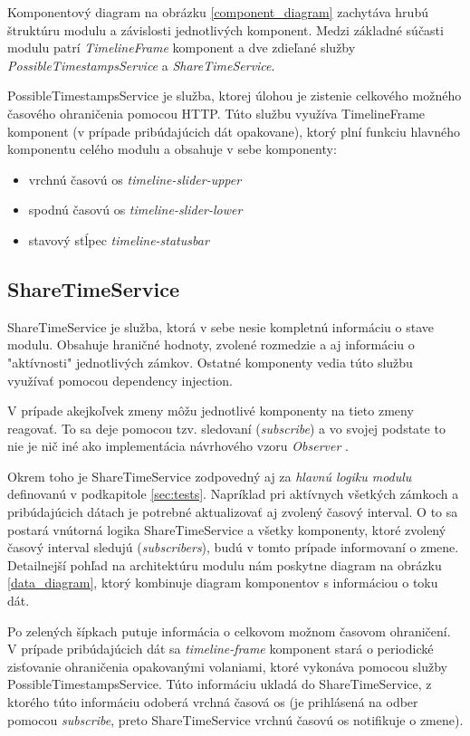\documentclass[
  digital, %
  twoside, %
  notable,   %
  nolof,   %
  nolot,   %
]{fithesis3}
\begin{document}
Komponentový diagram na obrázku \ref{component_diagram} zachytáva hrubú štruktúru modulu a závislosti jednotlivých komponent. Medzi základné súčasti modulu patrí \textit{TimelineFrame} komponent a dve zdieľané služby \textit{PossibleTimestampsService} a \textit{ShareTimeService}.

PossibleTimestampsService je služba, ktorej úlohou je zistenie celkového možného časového ohraničenia pomocou HTTP. Túto službu využíva TimelineFrame komponent (v prípade pribúdajúcich dát opakovane), ktorý plní funkciu hlavného komponentu celého modulu a obsahuje v sebe komponenty:
\begin{itemize}
\item vrchnú časovú os \textit{timeline-slider-upper}
\item spodnú časovú os \textit{timeline-slider-lower}
\item stavový stĺpec \textit{timeline-statusbar}
\end{itemize}

\subsection{ShareTimeService}
ShareTimeService je služba, ktorá v sebe nesie kompletnú informáciu o stave modulu. Obsahuje hraničné hodnoty, zvolené rozmedzie a aj informáciu o "{aktívnosti}" jednotlivých zámkov. Ostatné komponenty vedia túto službu využívať pomocou dependency injection.

V prípade akejkoľvek zmeny môžu jednotlivé komponenty na tieto zmeny reagovať. To sa deje pomocou tzv. sledovaní (\textit{subscribe}) a vo svojej podstate to nie je nič iné ako implementácia návrhového vzoru \textit{Observer} \cite{rhrjjv1994elements}.

Okrem toho je ShareTimeService zodpovedný aj za \textit{hlavnú logiku modulu} definovanú v podkapitole \ref{sec:tests}. Napríklad pri aktívnych všetkých zámkoch a pribúdajúcich dátach je potrebné aktualizovať aj zvolený časový interval. O to sa postará vnútorná logika ShareTimeService a všetky komponenty, ktoré zvolený časový interval sledujú (\textit{subscribers}), budú v tomto prípade informovaní o zmene. Detailnejší pohľad na architektúru modulu nám poskytne diagram na obrázku \ref{data_diagram}, ktorý kombinuje diagram komponentov s informáciou o toku dát.

Po zelených šípkach putuje informácia o celkovom možnom časovom ohraničení. V prípade pribúdajúcich dát sa \textit{timeline-frame} komponent stará o periodické zisťovanie ohraničenia opakovanými volaniami, ktoré vykonáva pomocou služby PossibleTimestampsService. Túto informáciu ukladá do ShareTimeService, z ktorého túto informáciu odoberá vrchná časová os (je prihlásená na odber pomocou \textit{subscribe}, preto ShareTimeService vrchnú časovú os notifikuje o zmene).
\end{document}
